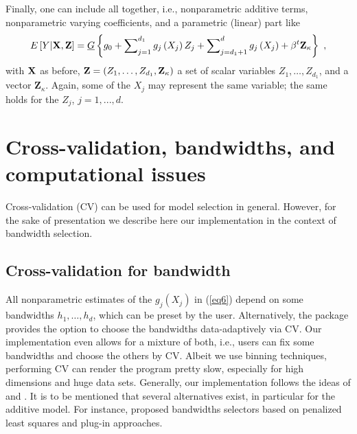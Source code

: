 Finally, one can include all together, i.e., nonparametric additive terms, nonparametric varying coefficients, and a parametric (linear) part like  
\begin{equation} \label{eq6}
E \left[ {Y\vert {\bf {X,Z}}} \right] = \underline{G} \left\{  {g_0 + \sum\nolimits_{j = 1}^{d_1} g_j \left( {X_j } \right) Z_j + \sum\nolimits_{j = d_1+1}^{d} g_j \left( {X_j } \right) + \beta^t {\mathbf Z}_\kappa } \right\} \ ,
\end{equation}
with ${\bf X}$ as before, ${\bf Z}=(Z_1,\ldots ,Z_{d_1},{\mathbf Z}_\kappa)$ a set of scalar variables $Z_1,\ldots ,Z_{d_1}$, and a vector ${\mathbf Z}_\kappa$.
Again, some of the $X_j$ may represent the same variable; the same holds for the $Z_j$, $j=1,...,d$.


\section{Cross-validation, bandwidths, and computational issues} \label{sec-banda}

Cross-validation (CV) can be used for model selection in general.
However, for the sake of presentation we describe here
our implementation in the context of bandwidth selection.
 

\subsection{Cross-validation for bandwidth}

All nonparametric estimates of the $ g_j (X_j)$ in (\ref{eq6}) depend on some bandwidths $h_1,\ldots,h_d$, which can be preset by the user. Alternatively, the package provides the option to choose the bandwidths data-adaptively via CV. Our implementation even allows for a mixture of both, i.e., users can fix some bandwidths and choose the others by CV. 
Albeit we use binning techniques, performing CV can render the program pretty slow, especially for high dimensions and huge data sets. Generally, our implementation follows the ideas of \citet{NS2005} and \citet{RS2010}. 
It is to be mentioned that several alternatives exist, in particular for the additive model. For instance, \citet{MP2005} proposed bandwidths selectors based on penalized least squares and plug-in approaches.  

